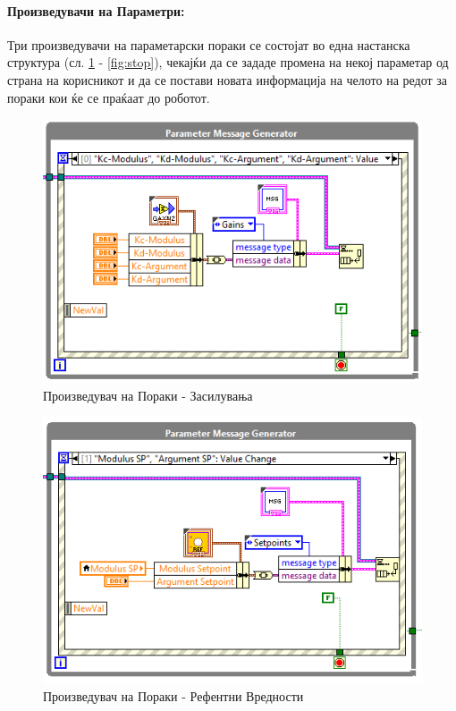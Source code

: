 \documentclass[11pt]{article}
\begin{document}
    \paragraph{Произведувачи на Параметри:\\}
      Три произведувачи на параметарски пораки се состојат во една настанска структура (сл. \ref{fig:gains} - \ref{fig:stop}), чекајќи да се зададе промена на некој параметар од страна на корисникот и да се постави новата информација на челото на редот за пораки кои ќе се праќаат до роботот.
      \begin{figure}[H]
          \centering
          \includegraphics[width=0.75\linewidth]{./images/gain_message_generator.png}
          \caption{Произведувач на Пораки - Засилувања}
          \label{fig:gains}
          \end{figure}
      \begin{figure}[H]
          \centering
          \includegraphics[width=0.75\linewidth]{./images/setpoint_message_generator.png}
          \caption{Произведувач на Пораки - Рефентни Вредности}
          \end{figure}
\end{document}
